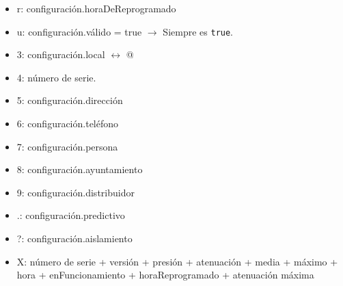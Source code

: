 \begin{itemize}
    \item r: configuración.horaDeReprogramado
    \item u: configuración.válido = true $\rightarrow$ Siempre es \verb|true|.
    \item 3: configuración.local $\leftrightarrow$ @
    \item 4: número de serie.
    \item 5: configuración.dirección
    \item 6: configuración.teléfono
    \item 7: configuración.persona
    \item 8: configuración.ayuntamiento
    \item 9: configuración.distribuidor
    \item .: configuración.predictivo
    \item ?: configuración.aislamiento
    \item X: número de serie + versión + presión + atenuación + media + máximo + hora + enFuncionamiento + horaReprogramado + atenuación máxima
\end{itemize}